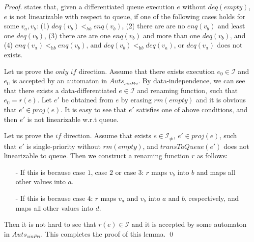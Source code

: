 \AutoForPQwithSignlePri*

\begin {proof}

\cite{Bouajjani:2015} states that, given a differentiated queue execution $e$ without $\textit{deq}(\textit{empty})$, $e$ is not linearizable with respect to queue, if one of the following cases holds for some $v_a,v_b$: (1) $\textit{deq}(v_b) <_{hb} \textit{enq}(v_b)$, (2) there are are no $\textit{enq}(v_b)$ and least one $\textit{deq}(v_b)$, (3) there are are one $\textit{enq}(v_b)$ and more than one $\textit{deq}(v_b)$, and (4) $\textit{enq}(v_a) <_{\textit{hb}} \textit{enq}(v_b)$, and $\textit{deq}(v_b) <_{\textit{hb}} \textit{deq}(v_a)$, or $\textit{deq}(v_a)$ does not exists.

Let us prove the $\textit{only if}$ direction. Assume that there exists execution $e_0 \in \mathcal{I}$ and $e_0$ is accepted by an automaton in $\textit{Auts}_{\textit{sinPri}}$. By data-independence, we can see that there exists a data-differentiated $e \in \mathcal{I}$ and renaming function, such that $e_0=r(e)$. Let $e'$ be obtained from $e$ by erasing $\textit{rm}(\textit{empty})$ and it is obvious that $e' \in \textit{proj}(e)$. It is easy to see that $e'$ satisfies one of above conditions, and then $e'$ is not linearizable w.r.t queue.

Let us prove the $\textit{if}$ direction. Assume that exists $e \in \mathcal{I}_{\neq}$, $e' \in \textit{proj}(e)$, such that $e'$ is single-priority  without $\textit{rm}(\textit{empty})$, and $\textit{transToQueue}(e')$ does not linearizable to queue. Then we construct a renaming function $r$ as follows:

\begin{itemize}
\setlength{\itemsep}{0.5pt}
\item[-] If this is because case $1$, case $2$ or case $3$: $r$ maps $v_b$ into $b$ and maps all other values into $a$.

\item[-] If this is because case $4$: $r$ maps $v_a$ and $v_b$ into $a$ and $b$, respectively, and maps all other values into $d$.
\end{itemize}

Then it is not hard to see that $r(e) \in \mathcal{I}$ and it is accepted by some automaton in $\textit{Auts}_{\textit{sinPri}}$. This completes the proof of this lemma. \qed
\end {proof}




